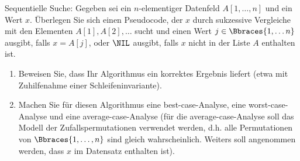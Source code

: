 
\begin{exercise}

Sequentielle Suche:
Gegeben sei ein $n$-elementiger Datenfeld $A[1, \ldots, n]$ und ein Wert $x$.
Überlegen Sie sich einen Pseudocode, der $x$ durch sukzessive Vergleiche mit den Elementen $A[1], A[2], \ldots$ sucht und einen Wert $j \in \Bbraces{1, \ldots n}$ ausgibt, falls $x = A[j]$, oder $\NIL$ ausgibt, falls $x$ nicht in der Liste $A$ enthalten ist.

\begin{enumerate}[label = (\alph*)]

    \item Beweisen Sie, dass Ihr Algorithmus ein korrektes Ergebnis liefert (etwa mit Zuhilfenahme einer Schleifeninvariante).

    \item Machen Sie für diesen Algorithmus eine best-case-Analyse, eine worst-case-Analyse und eine average-case-Analyse (für die average-case-Analyse soll das Modell der Zufallspermutationen verwendet werden, d.h. alle Permutationen von $\Bbraces{1, \ldots, n}$ sind gleich wahrscheinlich.
    Weiters soll angenommen werden, dass $x$ im Datensatz enthalten ist).

\end{enumerate}

\end{exercise}


